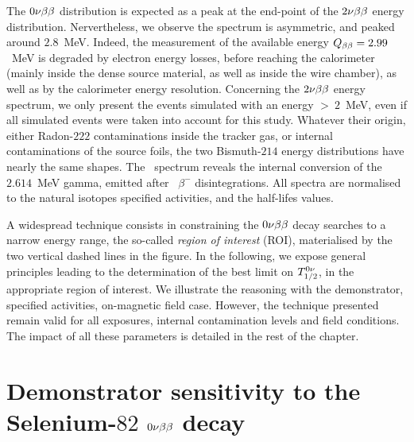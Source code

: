 The $0\nu\beta\beta$ distribution is expected as a peak at the end-point of the $2\nu\beta\beta$ energy distribution.
Nervertheless, we observe the spectrum is asymmetric, and peaked around $2.8$~MeV.
Indeed, the measurement of the available energy $Q_{\beta\beta} = 2.99$~MeV is degraded by electron energy losses, before reaching the calorimeter (mainly inside the dense source material, as well as inside the wire chamber), as well as by the calorimeter energy resolution.
Concerning the $2\nu\beta\beta$ energy spectrum, we only present the events simulated with an energy $>~2$~MeV, even if all simulated events were taken into account for this study.
Whatever their origin, either Radon-$222$ contaminations inside the tracker gas, or internal contaminations of the source foils, the two Bismuth-$214$ energy distributions have nearly the same shapes.
The \Tl\ spectrum reveals the internal conversion of the $2.614$~MeV gamma, emitted after \Tl\ $\beta^{-}$ disintegrations.
All spectra are normalised to the natural isotopes specified activities, and the half-lifes values.

A widespread technique consists in constraining the $0\nu\beta\beta$ decay searches to a narrow energy range, the so-called \emph{region of interest} (ROI), materialised by the two vertical dashed lines in the figure.
In the following, we expose general principles leading to the determination of the best limit on $T_{1/2}^{0\nu}$, in the appropriate region of interest.
We illustrate the reasoning with the demonstrator, specified activities, on-magnetic field case.
However, the technique presented remain valid for all exposures, internal contamination levels and field conditions.
The impact of all these parameters is detailed in the rest of the chapter.

\section{Demonstrator sensitivity to the Selenium-$82$ $0\nu\beta\beta$ decay}
\label{sec:Nbkg_ROI}


